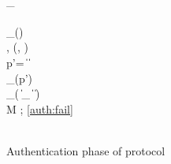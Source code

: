\begin{figure}
{ %
  \pcln \VC{\counter} \gets \VM{\counter} \< \< \\
 \pcln  \VC{\state} \gets  \tmp_{\VC{\state}}\\%
 \pcln {} \< \< \\
 \pcln \VC{\verifier} \gets \prf_{\VC{\salt}}(\VC{\pin}) \< \< \\
%
 \pcln  {}, \VC{\state} \gets \update(\VC{\state}, \VC{\counter}) \< \< \\
 \pcln p'=  \VM{\nonce} \|  \VM{\trans} \| \VC{\verifier}\< \< \\ %
 \pcln {} \gets \prf_{}(p') \< \< \pclb
  \\
 \pcln \< \<  \gets \prf_{}(\VS{\nonce} \| _ \| \VS{\trans} \| \VS{\verifier}) \\
 \pcln \< \< \pcif M \ne {} \pcthen \pcfail ;  \ref{auth:fail} \\
 \pcln \label{auth:fail}  \< \<   \\
 }
    \caption{Authentication phase of protocol}
    \label{fig:auth}
\end{figure}
